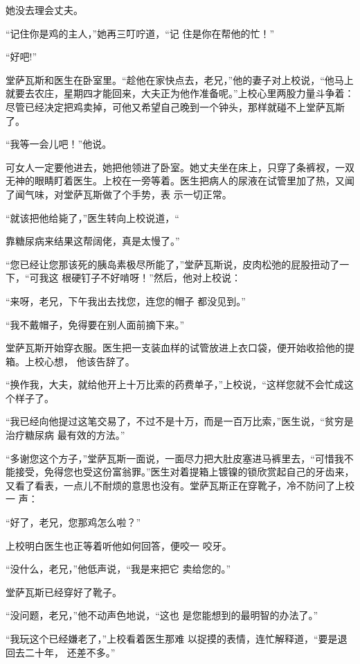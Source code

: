 \documentclass{article}
\begin{document}
她没去理会丈夫。 

\newpage

“记住你是鸡的主人，”她再三叮咛道，“记
住是你在帮他的忙！” 


“好吧!” 

堂萨瓦斯和医生在卧室里。“趁他在家快点去，老兄，”他的妻子对上校说，“他马上就要去农庄，星期四才能回来，大夫正为他作准备呢。”上校心里两股力量斗争着：尽管已经决定把鸡卖掉，可他又希望自己晚到一个钟头，那样就碰不上堂萨瓦斯了。


“我等一会儿吧！”他说。 

可女人一定要他进去，她把他领进了卧室。她丈夫坐在床上，只穿了条裤衩，一双无神的眼睛盯着医生。上校在一旁等着。医生把病人的尿液在试管里加了热，又闻了闻气味，对堂萨瓦斯做了个手势，表
示一切正常。 

“就该把他给毙了，”医生转向上校说道，“

\newpage
靠糖尿病来结果这帮阔佬，真是太慢了。” 

“您已经让您那该死的胰岛素极尽所能了，”堂萨瓦斯说，皮肉松弛的屁股扭动了一下，“可我这
根硬钉子不好啃呀！”然后，他对上校说： 

“来呀，老兄，下午我出去找您，连您的帽子
都没见到。” 

“我不戴帽子，免得要在别人面前摘下来。”

堂萨瓦斯开始穿衣服。医生把一支装血样的试管放进上衣口袋，便开始收拾他的提箱。上校心想，
他该告辞了。 

“换作我，大夫，就给他开上十万比索的药费单子，”上校说，“这样您就不会忙成这个样子了。

“我已经向他提过这笔交易了，不过不是十万，而是一百万比索，”医生说，“贫穷是治疗糖尿病
最有效的方法。” 

\newpage

“多谢您这个方子，”堂萨瓦斯一面说，一面尽力把大肚皮塞进马裤里去，“可惜我不能接受，免得您也受这份富翁罪。”医生对着提箱上镀镍的锁欣赏起自己的牙齿来，又看了看表，一点儿不耐烦的意思也没有。堂萨瓦斯正在穿靴子，冷不防问了上校一
声： 


“好了，老兄，您那鸡怎么啦？” 

上校明白医生也正等着听他如何回答，便咬一
咬牙。 

“没什么，老兄，”他低声说，“我是来把它
卖给您的。” 


堂萨瓦斯已经穿好了靴子。 

“没问题，老兄，”他不动声色地说，“这也
是您能想到的最明智的办法了。” 

“我玩这个已经嫌老了，”上校看着医生那难
\newpage
以捉摸的表情，连忙解释道，“要是退回去二十年，
还差不多。” 
\end{document}
